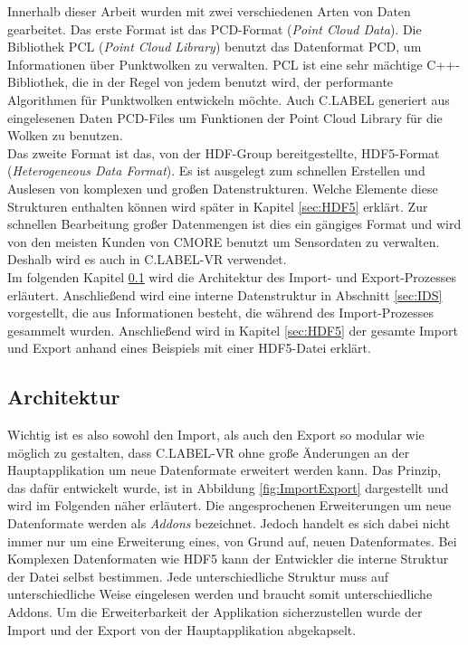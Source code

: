 Innerhalb dieser Arbeit wurden mit zwei verschiedenen Arten von Daten gearbeitet. Das erste Format ist das PCD-Format (\textit{Point Cloud Data}). Die Bibliothek PCL (\textit{Point Cloud Library}) benutzt das Datenformat PCD, um Informationen über Punktwolken zu verwalten. PCL ist eine sehr mächtige C++-Bibliothek, die in der Regel von jedem benutzt wird, der performante Algorithmen für Punktwolken entwickeln möchte. Auch C.LABEL generiert aus eingelesenen Daten PCD-Files um Funktionen der Point Cloud Library für die Wolken zu benutzen.\\

Das zweite Format ist das, von der HDF-Group bereitgestellte, HDF5-Format (\textit{Heterogeneous Data Format}). Es ist ausgelegt zum schnellen Erstellen und Auslesen von komplexen und großen Datenstrukturen. Welche Elemente diese Strukturen enthalten können wird später in Kapitel \ref{sec:HDF5} erklärt. Zur schnellen Bearbeitung großer Datenmengen ist dies ein gängiges Format und wird von den meisten Kunden von CMORE benutzt um Sensordaten zu verwalten. Deshalb wird es auch in C.LABEL-VR verwendet.\\

Im folgenden Kapitel \ref{sec:Architecture} wird die Architektur des Import- und Export-Prozesses erläutert. Anschließend wird eine interne Datenstruktur in Abschnitt \ref{sec:IDS} vorgestellt, die aus Informationen besteht, die während des Import-Prozesses gesammelt wurden. Anschließend wird in Kapitel \ref{sec:HDF5} der gesamte Import und Export anhand eines Beispiels mit einer HDF5-Datei erklärt.

\subsection{Architektur}
\label{sec:Architecture}

Wichtig ist es also sowohl den Import, als auch den Export so modular wie möglich zu gestalten, dass C.LABEL-VR ohne große Änderungen  an der Hauptapplikation um neue Datenformate erweitert werden kann. Das Prinzip, das dafür entwickelt wurde, ist in Abbildung \ref{fig:ImportExport} dargestellt und wird im Folgenden näher erläutert. Die angesprochenen Erweiterungen um neue Datenformate werden als \textit{Addons} bezeichnet. Jedoch handelt es sich dabei nicht immer nur um eine Erweiterung eines, von Grund auf, neuen Datenformates. 
Bei Komplexen Datenformaten wie HDF5 kann der Entwickler die interne Struktur der Datei selbst bestimmen. Jede unterschiedliche Struktur muss auf unterschiedliche Weise eingelesen werden und braucht somit unterschiedliche Addons. Um die Erweiterbarkeit der Applikation sicherzustellen wurde der Import und der Export von der Hauptapplikation abgekapselt.

